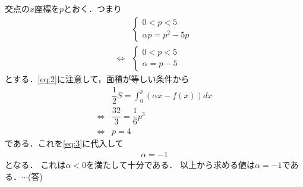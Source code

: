 \documentclass[../../main.tex]{subfiles}
\begin{document}
交点の$x$座標を$p$とおく．つまり
\begin{align}
  &
  \begin{cases}
    0<p<5 \\
    \alpha p=p^2-5p
  \end{cases}\nonumber \\
  \Longleftrightarrow
  &
  \begin{cases}
    0<p<5 \\
    \alpha =p-5
  \end{cases}\label{eq:3}
\end{align}
とする．\cref{eq:2}に注意して，面積が等しい条件から
\begin{align}
  &\dfrac{1}{2}S=\int_0^p(\alpha x-f(x))dx \\
  \Longleftrightarrow &\dfrac{32}{3}=\dfrac{1}{6}p^3\\
  \Longleftrightarrow &p=4
\end{align}
である．これを\cref{eq:3}に代入して
\begin{align}
  \alpha=-1
\end{align}
となる．
これは$\alpha<0$を満たして十分である．
以上から求める値は$\alpha=-1$である．$\cdots$(答)
\newpage
\end{document}
